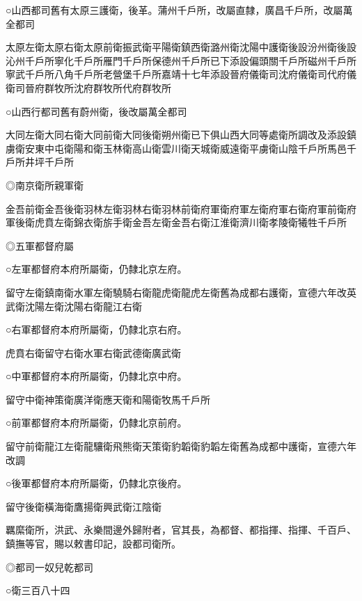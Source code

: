 ○山西都司舊有太原三護衛，後革。蒲州千戶所，改屬直隸，廣昌千戶所，改屬萬全都司

太原左衛太原右衛太原前衛振武衛平陽衛鎮西衛潞州衛沈陽中護衛後設汾州衛後設沁州千戶所寧化千戶所雁門千戶所保德州千戶所已下添設偏頭關千戶所磁州千戶所寧武千戶所八角千戶所老營堡千戶所嘉靖十七年添設晉府儀衛司沈府儀衛司代府儀衛司晉府群牧所沈府群牧所代府群牧所

○山西行都司舊有蔚州衛，後改屬萬全都司

大同左衛大同右衛大同前衛大同後衛朔州衛已下俱山西大同等處衛所調改及添設鎮虜衛安東中屯衛陽和衛玉林衛高山衛雲川衛天城衛威遠衛平虜衛山陰千戶所馬邑千戶所井坪千戶所

◎南京衛所親軍衛

金吾前衛金吾後衛羽林左衛羽林右衛羽林前衛府軍衛府軍左衛府軍右衛府軍前衛府軍後衛虎賁左衛錦衣衛旂手衛金吾左衛金吾右衛江淮衛濟川衛孝陵衛犧牲千戶所

◎五軍都督府屬

○左軍都督府本府所屬衛，仍隸北京左府。

留守左衛鎮南衛水軍左衛驍騎右衛龍虎衛龍虎左衛舊為成都右護衛，宣德六年改英武衛沈陽左衛沈陽右衛龍江右衛

○右軍都督府本府所屬衛，仍隸北京右府。

虎賁右衛留守右衛水軍右衛武德衛廣武衛

○中軍都督府本府所屬衛，仍隸北京中府。

留守中衛神策衛廣洋衛應天衛和陽衛牧馬千戶所

○前軍都督府本府所屬衛，仍隸北京前府。

留守前衛龍江左衛龍驤衛飛熊衛天策衛豹韜衛豹韜左衛舊為成都中護衛，宣德六年改調

○後軍都督府本府所屬衛，仍隸北京後府。

留守後衛橫海衛鷹揚衛興武衛江陰衛

羈縻衛所，洪武、永樂間邊外歸附者，官其長，為都督、都指揮、指揮、千百戶、鎮撫等官，賜以敕書印記，設都司衛所。

◎都司一奴兒乾都司

○衛三百八十四

